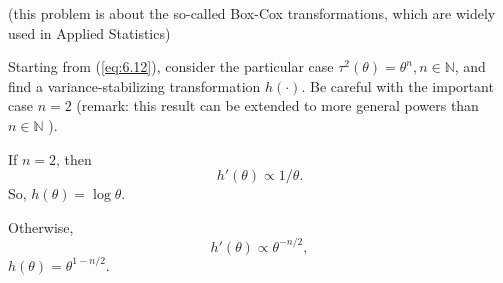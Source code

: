 \begin{ex}
    (this problem is about the so-called Box-Cox transformations, which are widely used in Applied Statistics) 
    
    Starting from (\ref{eq:6.12}), consider the particular case \(\tau^{2}(\theta)=\theta^{n}, n \in \mathbb{N}\), and find a variance-stabilizing transformation \(h(\cdot)\). Be careful with the important case \(n=2\) (remark: this result can be extended to more general powers than \(n \in \mathbb{N}\) ).
\end{ex}

\begin{solution}
    If $n=2$, then
    \[
        h'(\theta)\propto 1/\theta. 
    \]
    So, $h(\theta)=\log \theta$. 

    Otherwise, 
    \[
        h'(\theta)\propto \theta^{-n/2}, 
    \]
    $h(\theta)=\theta^{1-n/2}$. 
\end{solution}




